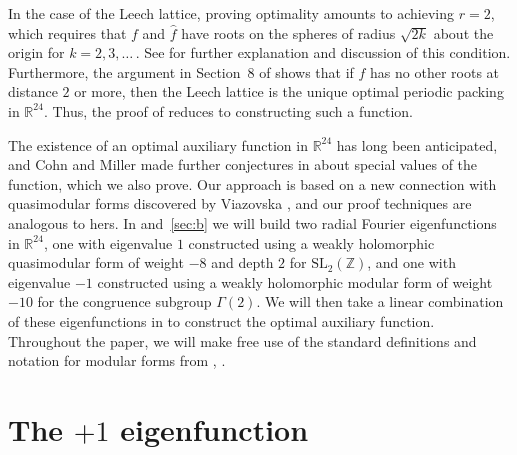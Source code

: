 \documentclass{aomart}
\theoremstyle{plain}
\numberwithin{theorem}{section}
\numberwithin{equation}{section}
\newcommand{\R}{{\mathbb R}}
\newcommand{\Z}{{\mathbb Z}}
\begin{document}
In the case of the Leech lattice, proving optimality amounts to achieving
$r=2$, which requires that $f$ and $\widehat{f}$ have roots on the spheres of
radius $\sqrt{2k}$ about the origin for $k=2,3,\dots$\,.  See \cite{CE} for
further explanation and discussion of this condition. Furthermore, the
argument in Section~8 of \cite{CE} shows that if $f$ has no other roots at
distance $2$ or more, then the Leech lattice is the unique optimal periodic
packing in $\R^{24}$.  Thus, the proof of  reduces
to constructing such a function.

The existence of an optimal auxiliary function in $\R^{24}$ has long been
anticipated, and Cohn and Miller made further conjectures in \cite{CM} about
special values of the function, which we also prove.  Our approach is based
on a new connection with quasimodular forms discovered by Viazovska \cite{V},
and our proof techniques are analogous to hers.  In 
and~\ref{sec:b} we will build two radial Fourier eigenfunctions in $\R^{24}$,
one with eigenvalue $1$ constructed using a weakly holomorphic quasimodular
form of weight $-8$ and depth $2$ for $\mathrm{SL}_2(\Z)$, and one with
eigenvalue $-1$ constructed using a weakly holomorphic modular form of weight
$-10$ for the congruence subgroup $\Gamma(2)$.  We will then take a linear
combination of these eigenfunctions in  to
construct the optimal auxiliary function. Throughout the paper, we will make
free use of the standard definitions and notation for modular forms from
\cite{V}, \cite{Z}.


\vspace{-0.1cm}

\section{The $+1$ eigenfunction}
\label{sec:a}

\vspace{-0.05cm}
\end{document}
